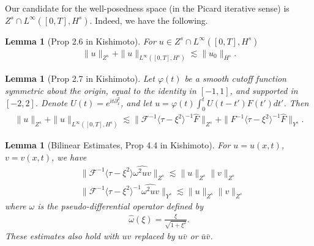 \documentclass{amsart}
\newtheorem{lemma}[theorem]{Lemma}
\newcommand{\wh}{\widehat}
\newcommand{\vp}{\varphi}
\newcommand{\p}{\partial}
\begin{document}
%
%
Our candidate for the well-posedness space (in the Picard iterative sense) is
$Z^{s} \cap L^{\infty}\left( [0, T], H^{s} \right)$. Indeed, we have the
following.
%
%
%
%
%
%
%
%
%
%
\begin{lemma}[Prop 2.6 in Kishimoto]
  For $u \in Z^{s} \cap L^{\infty}\left( [0,T], H^{s} \right)$
  \begin{equation*}
  \begin{split}
    \| u \|_{Z^{s}} + \| u \|_{L^{\infty}\left( [0,T], H^{s} \right)} \lesssim
    \| u_{0} \|_{H^{s}}.
  \end{split}
  \end{equation*}
\label{lem:init-data-b}
\end{lemma}
%
%
%
%
%
%
%                
%
%
%
%
\begin{lemma}[Prop 2.7 in Kishimoto]
  Let $\vp(t)$ be a smooth cutoff
  function symmetric about the origin, equal to the identity in $[-1, 1]$, and
  supported in $[-2,2]$. Denote $U(t) = e^{it \p_{x}^{2}}$, and let 
  $u = \vp(t) \int_{0}^{t} U(t - t') F(t') dt'$. Then
  \begin{equation*}
  \begin{split}
    \| u \|_{Z^{s}} + \| u \|_{L^{\infty}\left( [0,T], H^{s} \right)} \lesssim
    \| \mathcal{F}^{-1} \langle \tau - \xi^{2} \rangle ^{-1} \wh{F}
    \|_{Z^{s}} + \| F^{-1}\langle \tau - \xi^{2} \rangle^{-1} \wh{F}
    \|_{Y^{s}}.
  \end{split}
  \end{equation*}
  \label{lem:non-lin-to-bilin}
\end{lemma}
%
%
%
%
%
%
%
%
%
%
\begin{lemma}[Bilinear Estimates, Prop 4.4 in Kishimoto]
For $u = u(x,t)$, $v = v(x,t)$, we have
%
%
\begin{equation*}
\begin{split}
  & \|\mathcal{F}^{-1} \langle \tau - \xi^{2} \rangle \wh{\omega^{2} uv}
  \|_{Z^{s}} \lesssim \| u \|_{Z^{s}} \|v \|_{Z^{s}}
  \\
  & \| \mathcal{F}^{-1} \langle \tau - \xi^{2} \rangle ^{-1} \wh{\omega^{2} uv}
  \|_{Y^{s}} \lesssim \| u \|_{Z^{s}} \| v \|_{Z^{s}}
\end{split}
\end{equation*}
%
where $\omega$ is the pseudo-differential operator defined by
%
%
\begin{equation*}
\begin{split}
  \wh{\omega}(\xi) = \frac{\xi}{\sqrt{1 + \xi^{2}}}.
\end{split}
\end{equation*}
%
%
These estimates also hold with $uv$ replaced by $u \bar v$ or $\bar u \bar v$.
%
\label{lem:bilinear-estimates}
\end{lemma}
\end{document}
